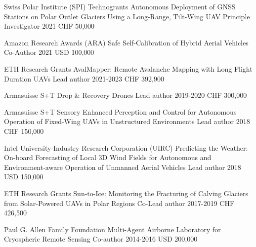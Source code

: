 \label{sec:funding}

\begin{cventries}

\begin{flushleft}
\end{flushleft}

\cvgrantentry
	{Swiss Polar Institute (SPI) Technogrants} %
	{Autonomous Deployment of GNSS Stations on Polar Outlet Glaciers Using a Long-Range, Tilt-Wing UAV} %
	{Principle Investigator} %
	{2021} %
	{CHF 50,000} %
	
\cvgrantentry
	{Amazon Research Awards (ARA)} %
	{Safe Self-Calibration of Hybrid Aerial Vehicles} %
	{Co-Author} %
	{2021} %
	{USD 100,000} %

\begin{flushleft}
\end{flushleft}

\cvgrantentry
	{ETH Research Grants} %
	{AvalMapper: Remote Avalanche Mapping with Long Flight Duration UAVs} %
	{Lead author} %
	{2021-2023} %
	{CHF 392,900} %
	
\cvgrantentry
	{Armasuisse S+T} %
	{Drop \& Recovery Drones} %
	{Lead author} %
	{2019-2020} %
	{CHF 300,000} %

\cvgrantentry
	{Armasuisse S+T} %
	{Sensory Enhanced Perception and Control for Autonomous Operation of Fixed-Wing UAVs in Unstructured Environments} %
	{Lead author} %
	{2018} %
	{CHF 150,000} %
	
\cvgrantentry
	{Intel University-Industry Research Corporation (UIRC)} %
	{Predicting the Weather: On-board Forecasting of Local 3D Wind Fields for Autonomous and Environment-aware Operation of Unmanned Aerial Vehicles} %
	{Lead author} %
	{2018} %
	{USD 150,000} %
	
\cvgrantentry
	{ETH Research Grants} %
	{Sun-to-Ice: Monitoring the Fracturing of Calving Glaciers from Solar-Powered UAVs in Polar Regions} %
	{Co-Lead author} %
	{2017-2019} %
	{CHF 426,500} %
	
\cvgrantentry
	{Paul G. Allen Family Foundation} %
	{Multi-Agent Airborne Laboratory for Cryospheric Remote Sensing} %
	{Co-author} %
	{2014-2016} %
	{USD 200,000} %
    
\end{cventries}



